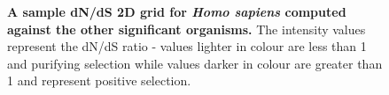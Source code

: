 \documentclass{article}
\begin{document}
\begin{figure}[]
\centering
{}
\caption{\textbf{A sample dN/dS 2D grid for \textit{Homo sapiens} computed against the other significant organisms.} The intensity values represent the dN/dS ratio - values lighter in colour are less than 1 and purifying selection while values darker in colour are greater than 1 and represent positive selection.}
\label{fig_4}
\end{figure}
\end{document}
